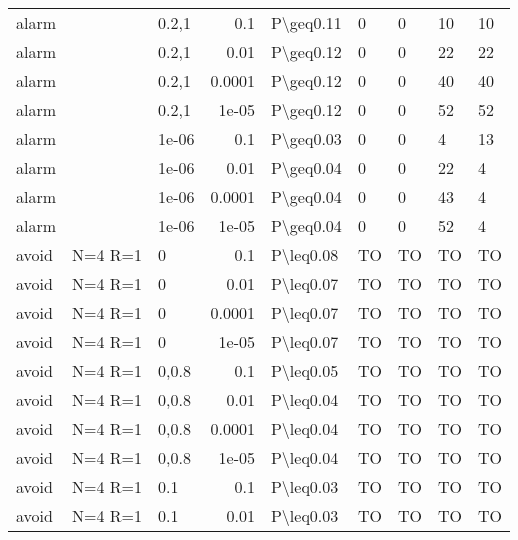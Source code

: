\begin{longtable}{lllrlllll}
 alarm         &           & 0.2,1 & 0.1    & P\textbackslash{}geq0.11  & 0    & 0    & 10       & 10      \\
 alarm         &           & 0.2,1 & 0.01   & P\textbackslash{}geq0.12  & 0    & 0    & 22       & 22      \\
 alarm         &           & 0.2,1 & 0.0001 & P\textbackslash{}geq0.12  & 0    & 0    & 40       & 40      \\
 alarm         &           & 0.2,1 & 1e-05  & P\textbackslash{}geq0.12  & 0    & 0    & 52       & 52      \\
 alarm         &           & 1e-06 & 0.1    & P\textbackslash{}geq0.03  & 0    & 0    & 4        & 13      \\
 alarm         &           & 1e-06 & 0.01   & P\textbackslash{}geq0.04  & 0    & 0    & 22       & 4       \\
 alarm         &           & 1e-06 & 0.0001 & P\textbackslash{}geq0.04  & 0    & 0    & 43       & 4       \\
 alarm         &           & 1e-06 & 1e-05  & P\textbackslash{}geq0.04  & 0    & 0    & 52       & 4       \\
 avoid         & N=4 R=1   & 0     & 0.1    & P\textbackslash{}leq0.08  & TO   & TO   & TO       & TO      \\
 avoid         & N=4 R=1   & 0     & 0.01   & P\textbackslash{}leq0.07  & TO   & TO   & TO       & TO      \\
 avoid         & N=4 R=1   & 0     & 0.0001 & P\textbackslash{}leq0.07  & TO   & TO   & TO       & TO      \\
 avoid         & N=4 R=1   & 0     & 1e-05  & P\textbackslash{}leq0.07  & TO   & TO   & TO       & TO      \\
 avoid         & N=4 R=1   & 0,0.8 & 0.1    & P\textbackslash{}leq0.05  & TO   & TO   & TO       & TO      \\
 avoid         & N=4 R=1   & 0,0.8 & 0.01   & P\textbackslash{}leq0.04  & TO   & TO   & TO       & TO      \\
 avoid         & N=4 R=1   & 0,0.8 & 0.0001 & P\textbackslash{}leq0.04  & TO   & TO   & TO       & TO      \\
 avoid         & N=4 R=1   & 0,0.8 & 1e-05  & P\textbackslash{}leq0.04  & TO   & TO   & TO       & TO      \\
 avoid         & N=4 R=1   & 0.1   & 0.1    & P\textbackslash{}leq0.03  & TO   & TO   & TO       & TO      \\
 avoid         & N=4 R=1   & 0.1   & 0.01   & P\textbackslash{}leq0.03  & TO   & TO   & TO       & TO      \\

\end{longtable}

